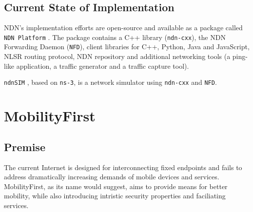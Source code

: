 

        \subsection{Current State of Implementation}

            NDN's implementation efforts are open-source and available as a package called \texttt{NDN Platform} \cite{ndn_platform}. The package contains a C++ library (\texttt{ndn-cxx}), the NDN Forwarding Daemon (\texttt{NFD}), client libraries for C++, Python, Java and JavaScript, NLSR routing protocol, NDN repository and additional networking tools (a ping-like application, a traffic generator and a traffic capture tool).

            \texttt{ndnSIM} \cite{ndn_sim}, based on \texttt{ns-3}, is a network simulator using \texttt{ndn-cxx} and \texttt{NFD}.


    \section{MobilityFirst}\label{archs:mobilityfirst}

        \subsection{Premise}

            The current Internet is designed for interconnecting fixed endpoints and fails to address dramatically increasing demands of mobile devices and services. MobilityFirst, as its name would suggest, aims to provide means for better mobility, while also introducing intristic security properties and faciliating services.

